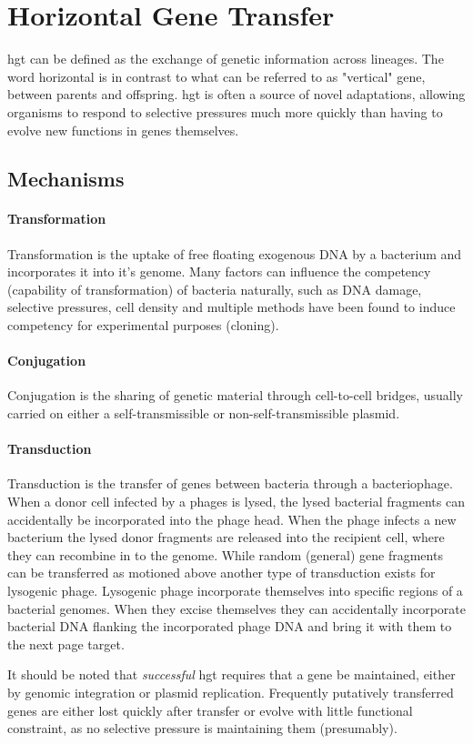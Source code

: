 \section{Horizontal Gene Transfer}
\ac{hgt} can be defined as the exchange of genetic information across lineages\citep{lgt}.
The word horizontal is in contrast to what can be referred to as "vertical" gene, between parents and offspring\citep{ihgt}.
\ac{hgt} is often a source of novel adaptations, allowing organisms to respond to selective pressures much more quickly than having to evolve new functions in genes themselves\citep{ihgt,adaevo}.\par
\subsection{Mechanisms}
\paragraph{Transformation}
Transformation is the uptake of free floating exogenous DNA by a bacterium and incorporates it into it's genome\citep{lgt}.
Many factors can influence the competency (capability of transformation) of bacteria naturally, such as DNA damage, selective pressures, cell density and multiple methods have been found to induce competency for experimental purposes (cloning)\citep{natcomp}.
\paragraph{Conjugation}
Conjugation is the sharing of genetic material through cell-to-cell bridges, usually carried on either a self-transmissible or non-self-transmissible plasmid\citep{conjug}.
\paragraph{Transduction}
Transduction is the transfer of genes between bacteria through a bacteriophage\citep{transd}.
When a donor cell infected by a phages is lysed, the lysed bacterial fragments can accidentally be incorporated into the phage head\citep{transd}.
When the phage infects a new bacterium the lysed donor fragments are released into the recipient cell, where they can recombine in to the genome\citep{transd}.
While random (general) gene fragments can be transferred as motioned above another type of transduction exists for lysogenic phage\citep{transd}.
Lysogenic phage incorporate themselves into specific regions of a bacterial genomes\citep{transd}.
When they excise themselves they can accidentally incorporate bacterial DNA flanking the incorporated phage DNA and bring it with them to the next page target\citep{transd}.\par
It should be noted that \textit{successful} \ac{hgt} requires that a gene be maintained, either by genomic integration or plasmid replication.
Frequently putatively transferred genes are either lost quickly after transfer or evolve with little functional constraint, as no selective pressure is maintaining them (presumably)\citep{fastlane}.
